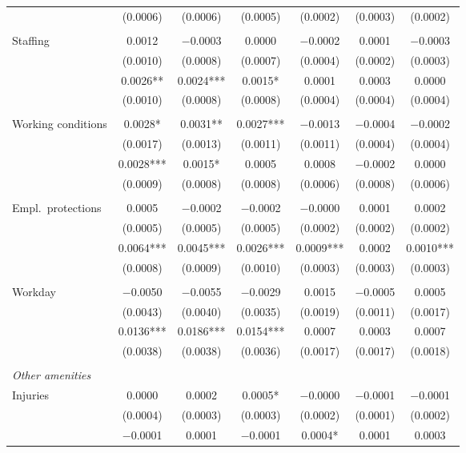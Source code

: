\documentclass[12pt,letterpaper]{article}
\begin{document}
\begin{longtable}{l cccccc}
  & (0.0006) & (0.0006) & (0.0005) & (0.0002) & (0.0003) & (0.0002) \\
 & & & & & & \\
\quad Staffing & 0.0012 & $-$0.0003 & 0.0000 & $-$0.0002 & 0.0001 & $-$0.0003 \\
  & (0.0010) & (0.0008) & (0.0007) & (0.0004) & (0.0002) & (0.0003) \\
  & 0.0026** & 0.0024*** & 0.0015* & 0.0001 & 0.0003 & 0.0000 \\
  & (0.0010) & (0.0008) & (0.0008) & (0.0004) & (0.0004) & (0.0004) \\
 & & & & & & \\
\quad Working conditions & 0.0028* & 0.0031** & 0.0027*** & $-$0.0013 & $-$0.0004 & $-$0.0002 \\
  & (0.0017) & (0.0013) & (0.0011) & (0.0011) & (0.0004) & (0.0004) \\
  & 0.0028*** & 0.0015* & 0.0005 & 0.0008 & $-$0.0002 & 0.0000 \\
  & (0.0009) & (0.0008) & (0.0008) & (0.0006) & (0.0008) & (0.0006) \\
 & & & & & & \\
\quad Empl.\ protections & 0.0005 & $-$0.0002 & $-$0.0002 & $-$0.0000 & 0.0001 & 0.0002 \\
  & (0.0005) & (0.0005) & (0.0005) & (0.0002) & (0.0002) & (0.0002) \\
  & 0.0064*** & 0.0045*** & 0.0026*** & 0.0009*** & 0.0002 & 0.0010*** \\
  & (0.0008) & (0.0009) & (0.0010) & (0.0003) & (0.0003) & (0.0003) \\
 & & & & & & \\
\quad Workday & $-$0.0050 & $-$0.0055 & $-$0.0029 & 0.0015 & $-$0.0005 & 0.0005 \\
  & (0.0043) & (0.0040) & (0.0035) & (0.0019) & (0.0011) & (0.0017) \\
  & 0.0136*** & 0.0186*** & 0.0154*** & 0.0007 & 0.0003 & 0.0007 \\
  & (0.0038) & (0.0038) & (0.0036) & (0.0017) & (0.0017) & (0.0018) \\
 & & & & & & \\
\midrule
\multicolumn{7}{l}{\textit{Other amenities}} \\
\quad Injuries & 0.0000 & 0.0002 & 0.0005* & $-$0.0000 & $-$0.0001 & $-$0.0001 \\
  & (0.0004) & (0.0003) & (0.0003) & (0.0002) & (0.0001) & (0.0002) \\
  & $-$0.0001 & 0.0001 & $-$0.0001 & 0.0004* & 0.0001 & 0.0003 \\

\end{longtable}
\end{document}
